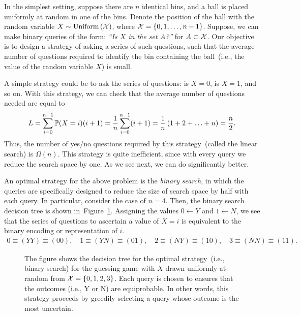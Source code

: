 \documentclass[12pt]{article}
\begin{document}
       \begin{question} 
           \label{question:binary-search-game}
           In the simplest setting, suppose there are $n$ identical bins, and a ball is placed uniformly at random in one of the bins. Denote the position of the ball with the random variable $X \sim \text{Uniform}\left( \mathcal{X} \right)$, where $\mathcal{X} = \{0, 1, \ldots, n-1\}$. Suppose, we can make binary queries of the form: \emph{``Is $X$ in the set $A$?''} for $A \subset \mathcal{X}$.  Our objective is to design a strategy of asking a series of such questions, such that the average number of questions required to identify the bin containing the ball~(i.e., the value of the random variable $X$) is small. 
       \end{question} 

        A simple strategy could be to ask the series of questions: is $X=0$, is $X=1$, and so on. With this strategy, we can check that the average number of questions needed are equal to 
        \begin{align}
            L = \sum_{i=0}^{n-1} \mathbb{P}(X=i) (i+1) = \frac{1}{n} \sum_{i=0}^{n-1} (i+1) = \frac{1}{n} \left( 1 + 2 + \ldots + n\right) = \frac{n}{2}. 
        \end{align}
        Thus, the number of yes/no questions required by this strategy~(called the linear search) is $\Omega(n)$. This strategy is quite inefficient, since with every query we reduce the search space by one. As we see next, we can do significantly better. 

         An optimal strategy for the above problem is the \emph{binary search}, in which the queries are specifically designed to reduce the size of search space by half with each query.  In particular, consider the case of $n=4$. Then, the binary search decision tree is shown in~Figure~\ref{fig:binary-search}. Assigning the values $0 \leftarrow Y$ and $1\leftarrow N$, we see that the series of questions to ascertain a value of $X=i$ is equivalent to the binary encoding or representation of $i$. 
         \begin{align}
             0  \equiv (YY) \equiv (00), \quad 
             1  \equiv (YN) \equiv (01), \quad 
             2  \equiv (NY) \equiv (10), \quad
             3  \equiv (NN) \equiv (11) . 
         \end{align}
         

        \begin{figure}[hbt!]
            \centering
            \def\figwidth{0.5\columnwidth}
            \def\figheight{0.25\columnwidth} %
            
            \caption{The figure shows the decision tree for the optimal strategy~(i.e., binary search) for the guessing game with $X$ drawn uniformly at random from $\mathcal{X} = \{0, 1, 2, 3\}$. Each query is chosen to ensures that the outcomes (i.e., Y or N) are equiprobable. In other words, this strategy proceeds by greedily selecting a query whose outcome is the most uncertain.}
            \label{fig:binary-search}
        \end{figure}
  
\end{document}

